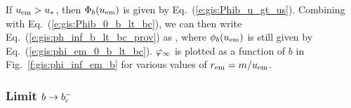 If $u_{\rm em} > u_*$, then $\Phi_b(u_{\rm em})$ is given by Eq.~(\ref{e:gis:Phib_u_gt_us}).
Combining with Eq.~(\ref{e:gis:Phib_0_b_lt_bc}), we can then write
Eq.~(\ref{e:gis:ph_inf_b_lt_bc_prov}) as
\be \label{e:gis:ph_inf_u_em_gt_us}
      ,
\ee
where $\phi_b(u_{\rm em})$ is still given by Eq.~(\ref{e:gis:phi_em_0_b_lt_bc}).
$\varphi_\infty$ is plotted as a function of $b$ in Fig.~\ref{f:gis:phi_inf_em_b}
for various values of $r_{\rm em} = m / u_{\rm em}$.


\subsubsection{Limit $b \to b_{\rm c}^-$}

